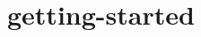\chapter{getting-\/started}
\hypertarget{md_tutorials_2getting-started}{}\label{md_tutorials_2getting-started}
